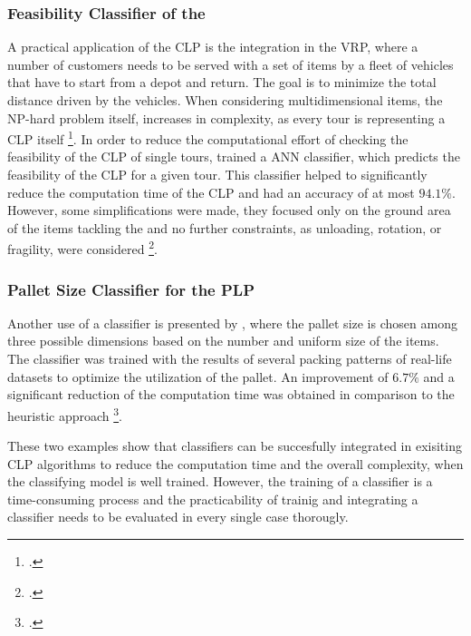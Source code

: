 \subsubsection{Feasibility Classifier of the }
A practical application of the \gls{CLP} is the integration in the \gls{VRP}, where
a number of customers needs to be served with a set of items by a fleet of vehicles that have
to start from a depot and return. The goal is to minimize the total distance driven
by the vehicles. When considering multidimensional items, the NP-hard problem itself,
increases in complexity, as every tour is representing a \gls{CLP} itself \footcite[cf.][pp. 1--2]{tamke_branch-and-cut_2024}.
In order to reduce the computational effort of checking the feasibility of the \gls{CLP}
of single tours, \citeauthor{zhang_learning-based_2022} trained a \gls{ANN} classifier, which predicts
the feasibility of the \gls{CLP} for a given tour. This classifier helped to significantly
reduce the computation time of the \gls{CLP} and had an accuracy of at most $94.1\%$.
However, some simplifications were made, they focused only on the ground area of the items
tackling the  and no further constraints, as unloading, rotation,
or fragility, were considered \footcite[cf.][pp. 4, 14]{zhang_learning-based_2022}.

\subsubsection{Pallet Size Classifier for the \gls{PLP}}
Another use of a classifier is presented by \citeauthor{aylak_application_2021}, where the pallet
size is chosen among three possible dimensions based on the number and uniform size of the items.
The classifier was trained with the results of several packing patterns of real-life datasets
to optimize the utilization of the pallet. An improvement of $6.7\%$ and a significant reduction
of the computation time was obtained in comparison to the heuristic approach
\footcite[cf.][pp. 12--14]{aylak_application_2021}.\parbreak

These two examples show that classifiers can be succesfully integrated in exisiting \gls{CLP}
algorithms to reduce the computation time and the overall complexity, when the classifying model
is well trained. However, the training of a classifier is a time-consuming process and the
practicability of trainig and integrating a classifier needs to be evaluated in every single
case thorougly.
